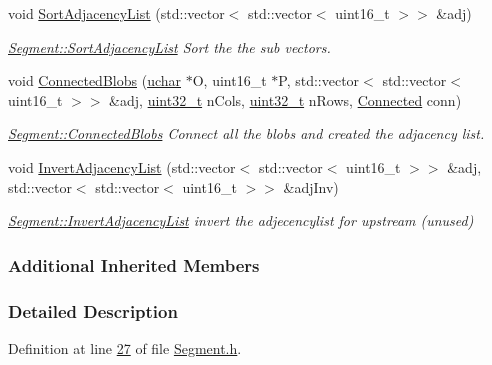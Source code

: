 \begin{DoxyCompactItemize}
void \hyperlink{class_vision_1_1_segment_a3d369e9d8b65dc96a3d4ac5ab8887960}{Sort\+Adjacency\+List} (std\+::vector$<$ std\+::vector$<$ uint16\+\_\+t $>$$>$ \&adj)
\begin{DoxyCompactList}\small\item\em \hyperlink{class_vision_1_1_segment_a3d369e9d8b65dc96a3d4ac5ab8887960}{Segment\+::\+Sort\+Adjacency\+List} Sort the the sub vectors. \end{DoxyCompactList}\item 
void \hyperlink{class_vision_1_1_segment_a77bbb909901188d02a42c7df29186289}{Connected\+Blobs} (\hyperlink{_soil_math_types_8h_a65f85814a8290f9797005d3b28e7e5fc}{uchar} $\ast$O, uint16\+\_\+t $\ast$P, std\+::vector$<$ std\+::vector$<$ uint16\+\_\+t $>$$>$ \&adj, \hyperlink{_soil_math_types_8h_a435d1572bf3f880d55459d9805097f62}{uint32\+\_\+t} n\+Cols, \hyperlink{_soil_math_types_8h_a435d1572bf3f880d55459d9805097f62}{uint32\+\_\+t} n\+Rows, \hyperlink{class_vision_1_1_segment_a330240c08320e72270fac0aa83d5e27e}{Connected} conn)
\begin{DoxyCompactList}\small\item\em \hyperlink{class_vision_1_1_segment_a77bbb909901188d02a42c7df29186289}{Segment\+::\+Connected\+Blobs} Connect all the blobs and created the adjacency list. \end{DoxyCompactList}\item 
void \hyperlink{class_vision_1_1_segment_aac70975917e231c4879ff4f837ac9f73}{Invert\+Adjacency\+List} (std\+::vector$<$ std\+::vector$<$ uint16\+\_\+t $>$$>$ \&adj, std\+::vector$<$ std\+::vector$<$ uint16\+\_\+t $>$$>$ \&adj\+Inv)
\begin{DoxyCompactList}\small\item\em \hyperlink{class_vision_1_1_segment_aac70975917e231c4879ff4f837ac9f73}{Segment\+::\+Invert\+Adjacency\+List} invert the adjecencylist for upstream (unused) \end{DoxyCompactList}\end{DoxyCompactItemize}
\subsubsection*{Additional Inherited Members}


\subsubsection{Detailed Description}


Definition at line \hyperlink{_segment_8h_source_l00027}{27} of file \hyperlink{_segment_8h_source}{Segment.\+h}.



